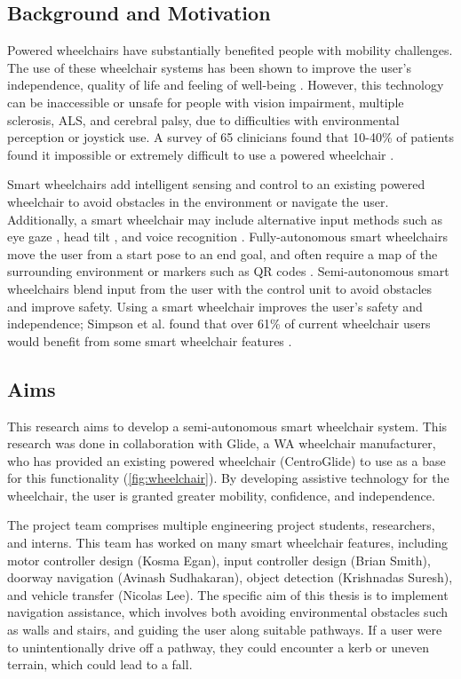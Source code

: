 \subsection{Background and Motivation}
Powered wheelchairs have substantially benefited people with mobility challenges.
The use of these wheelchair systems has been shown to improve the user's independence, quality
of life and feeling of well-being \cite{treflerOutcomesWheelchairSystems2004}.
However, this technology can be inaccessible or unsafe for people with vision impairment,
multiple sclerosis, ALS, and cerebral palsy, due to difficulties with environmental perception
or joystick use. A survey of 65 clinicians found that 10-40\% of patients found it impossible or
extremely difficult to use a powered wheelchair \cite{fehrAdequacyPowerWheelchair2000}.

Smart wheelchairs add intelligent sensing and control to an existing powered wheelchair
to avoid obstacles in the environment or navigate the user.
Additionally, a smart wheelchair may include alternative input methods such as
eye gaze \cite{eidNovelEyeGazeControlledWheelchair2016}, head tilt \cite{tomariEnhancingWheelchairControl2014},
and voice recognition \cite{bakouriSteeringRoboticWheelchair2022}.
Fully-autonomous smart wheelchairs move the user from a start pose to an end goal,
and often require a map of the surrounding environment or markers
such as QR codes \cite{habhaAutonomousWheelchairIndoorOutdoor2021}.
Semi-autonomous smart wheelchairs blend input from the user with the control unit
to avoid obstacles and improve safety. Using a smart wheelchair improves the user's
safety and independence; Simpson et al. found that over 61\% of
current wheelchair users would benefit from some smart wheelchair features \cite{simpsonHowManyPeople2008}.

\subsection{Aims}
This research aims to develop a semi-autonomous smart wheelchair system.
This research was done in collaboration with Glide, a WA wheelchair manufacturer,
who has provided an existing powered wheelchair (CentroGlide) to use as a base
for this functionality (\cref{fig:wheelchair}). By developing assistive technology for the wheelchair,
the user is granted greater mobility, confidence, and independence.

The project team comprises multiple engineering project students, researchers, and interns.
This team has worked on many smart wheelchair features, including motor controller design (Kosma Egan),
input controller design (Brian Smith), doorway navigation (Avinash Sudhakaran),
object detection (Krishnadas Suresh), and vehicle transfer (Nicolas Lee).
The specific aim of this thesis is to implement navigation assistance,
which involves both avoiding environmental obstacles such as walls and stairs,
and guiding the user along suitable pathways. If a user were to unintentionally
drive off a pathway, they could encounter a kerb or uneven terrain, which could lead
to a fall.

